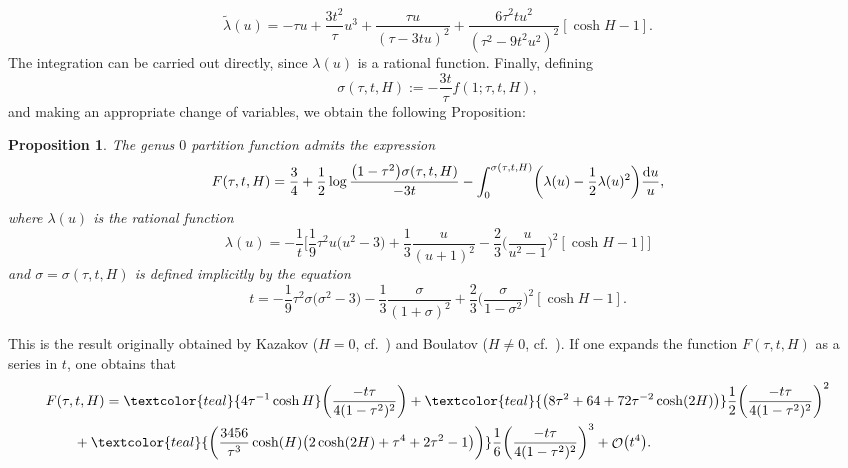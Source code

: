 \documentclass[10pt,a4paper]{amsart}
\DeclareMathOperator{\OO}{\mathcal{O}}
\numberwithin{equation}{section}
\newtheorem{Proposition}[Theorem]{Proposition}
 { \theoremstyle{definition}
\newtheorem{Definition}[Theorem]{Definition}
\newtheorem{Note}[Theorem]{Note}
\newtheorem{Example}[Theorem]{Example}
\newtheorem{Remark}[Theorem]{Remark} }
\begin{document}
 \begin{equation*}
 \tilde{\lambda}(u) = -\tau u + \frac{3t^2}{\tau}u^3 + \frac{\tau u}{(\tau - 3tu)^2}+\frac{6\tau^2tu^2}{(\tau^2-9t^2u^2)^2}[\cosh H -1].
 \end{equation*}
The integration can be carried out directly, since $\lambda(u)$ is a rational function. Finally, defining
 \begin{equation*}
 \sigma(\tau,t,H) := -\frac{3t}{\tau}f(1;\tau,t,H),
 \end{equation*}
and making an appropriate change of variables, we obtain the following Proposition:
 \begin{Proposition}
 The genus $0$ partition function admits the expression
 \begin{equation*}
 F(\tau,t,H) = \frac{3}{4} + \frac{1}{2}\log \frac{\bigl(1-\tau^2\bigr)\sigma(\tau,t,H)}{-3t} - \int_{0}^{\sigma(\tau,t,H)}\biggl(\lambda(u)-\frac{1}{2}\lambda(u)^2\biggr) \frac{{\rm d}u}{u},
 \end{equation*}
 where $\lambda(u)$ is the rational function
 \begin{equation*}
 \lambda(u) = -\frac{1}{t}\biggl[\frac{1}{9}\tau^2u\bigl(u^2-3\bigr) + \frac{1}{3}\frac{u}{(u+1)^2} - \frac{2}{3}\biggl(\frac{u}{u^2-1}\biggr)^2[\cosh H -1]\biggr]
 \end{equation*}
 and $\sigma = \sigma(\tau,t,H)$ is defined implicitly by the equation
 \begin{equation*}
 t = -\frac{1}{9}\tau^2\sigma \bigl(\sigma^2 - 3\bigr) -\frac{1}{3}\frac{\sigma}{(1+\sigma)^2} + \frac{2}{3}\biggl(\frac{\sigma}{1-\sigma^2}\biggr)^2[\cosh H -1].
 \end{equation*}
 \end{Proposition}
This is the result originally obtained by Kazakov ($H=0$, cf.~\cite{Kazakov1}) and Boulatov ($H\neq 0$, cf.~\cite{Kazakov2}). If one expands
the function $F(\tau,t,H)$ as a series in $t$, one obtains that
 \begin{align} \label{Kazakov-F}
 &F(\tau,t,H)= \textcolor{teal}{4\tau^{-1}\cosh{H}}\biggl(\frac{-t\tau}{4(1-\tau^2)^2}\biggr) + \textcolor{teal}{\bigl(8\tau^2 + 64 +72\tau^{-2}\cosh(2H)\bigr)}\frac{1}{2}\biggl(\frac{-t\tau}{4(1-\tau^2)^2}\biggr)^2 \nonumber \\
 &\qquad{}+\textcolor{teal}{\biggl(\frac{3456}{\tau^3}\cosh(H)\bigl(2\cosh(2H)+\tau^4+2\tau^2-1\bigr)\biggr)}\frac{1}{6}\biggl(\frac{-t\tau}{4(1-\tau^2)^2}\biggr)^3 + \OO\bigl(t^4\bigr).
 \end{align}
\end{document}
